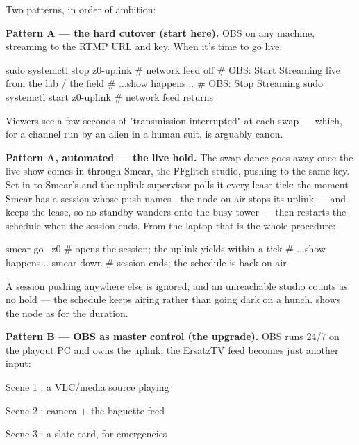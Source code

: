 \documentclass[fontpath=fonts/,logopath=logo/]{riposte-doc}
\begin{document}

Two patterns, in order of ambition:

\textbf{Pattern A — the hard cutover (start here).} OBS on any machine, streaming to the  RTMP URL and key. When it's time to go live:

\ripcodeopen
{}
\begin{ripcodeblock}
sudo systemctl stop z0-uplink     # network feed off
# OBS: Start Streaming              live from the lab / the field
# ...show happens...
# OBS: Stop Streaming
sudo systemctl start z0-uplink    # network feed returns
\end{ripcodeblock}
\ripcodesizereset\ripcodeclose

Viewers see a few seconds of "transmission interrupted" at each swap — which, for a channel run by an alien in a human suit, is arguably canon.

\textbf{Pattern A, automated — the live hold.} The swap dance goes away once the live show comes in through Smear, the FFglitch studio, pushing to the same key. Set  in  to Smear's  and the uplink supervisor polls it every lease tick: the moment Smear has a session whose push names , the node on air stops its uplink — and keeps the lease, so no standby wanders onto the busy tower — then restarts the schedule when the session ends. From the laptop that is the whole procedure:

\ripcodeopen
{}
\begin{ripcodeblock}
smear go --z0        # opens the session; the uplink yields within a tick
# ...show happens...
smear down           # session ends; the schedule is back on air
\end{ripcodeblock}
\ripcodesizereset\ripcodeclose

A session pushing anywhere else is ignored, and an unreachable studio counts as no hold — the schedule keeps airing rather than going dark on a hunch.  shows the node as  for the duration.

\textbf{Pattern B — OBS as master control (the upgrade).} OBS runs 24/7 on the playout PC and  owns the uplink; the ErsatzTV feed becomes just another input:

\begin{ripbullets}
\item Scene 1 : a VLC/media source playing 
\item Scene 2 : camera + the baguette feed
\item Scene 3 : a slate card, for emergencies
\end{ripbullets}
\end{document}
